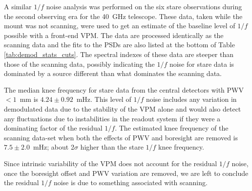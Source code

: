 \documentclass[twocolumn, tighten, numberedappendix, twocolappendix]{aastex63}
\begin{document}
A similar $1/f$ noise analysis was performed on the six stare observations during the second observing era for the 40~GHz telescope. These data, taken while the mount was not scanning, were used to get an estimate of the baseline level of $1/f$ possible with a front-end VPM. The data are processed identically as the scanning data and the fits to the PSDs are also listed at the bottom of Table \ref{tab:demod_stats_cuts}. The spectral indexes of these data are steeper than those of the scanning data, possibly indicating the $1/f$ noise for stare data is dominated by a source different than what dominates the scanning data.

The median knee frequency for stare data from the central detectors with PWV~$<1$~mm is $4.24\pm0.92$~mHz. This level of $1/f$ noise includes any variation in demodulated data due to the stability of the VPM alone and would also detect any fluctuations due to instabilities in the readout system if they were a dominating factor of the residual $1/f$. The estimated knee frequency of the scanning data-set when both the effects of PWV and boresight are removed is $7.5\pm2.0$~mHz; about 2$\sigma$ higher than the stare $1/f$ knee frequency.



Since intrinsic variability of the VPM does not account for the residual $1/f$ noise, once the boresight offset and PWV variation are removed, we are left to conclude the residual $1/f$ noise is due to something associated with scanning. 

\end{document}
